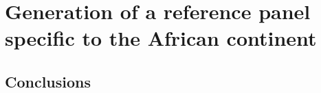 \chapter{Generation of a reference panel specific to the African continent}
\label{ch:reference_panel}









\section{Conclusions}